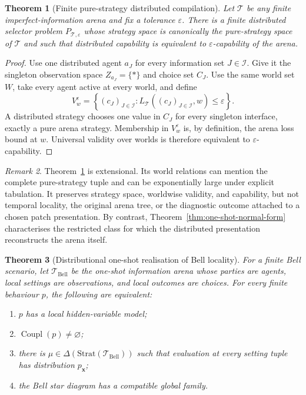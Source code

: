 \documentclass[11pt]{article}
\theoremstyle{plain}
\newtheorem{theorem}{Theorem}[section]
\theoremstyle{definition}
\theoremstyle{remark}
\newtheorem{remark}[theorem]{Remark}
\newcommand{\eps}{\varepsilon}
\begin{document}
\begin{theorem}[Finite pure-strategy distributed compilation]
\label{thm:finite-ii-compilation}
Let $\mathcal T$ be any finite imperfect-information arena and fix a tolerance
$\eps$. There is a finite distributed selector problem $P_{\mathcal T,\eps}$
whose strategy space is canonically the pure-strategy space of $\mathcal T$ and
such that distributed capability is equivalent to $\eps$-capability of the
arena.
\end{theorem}

\begin{proof}
Use one distributed agent $a_J$ for every information set $J\in\mathcal I$.
Give it the singleton observation space $Z_{a_J}=\{\ast\}$ and choice set $C_J$.
Use the same world set $W$, take every agent active at every world, and define
\[
V_w^\eps=
\left\{(c_J)_{J\in\mathcal I}:
L_{\mathcal T}((c_J)_{J\in\mathcal I},w)\le\eps\right\}.
\]
A distributed strategy chooses one value in $C_J$ for every singleton
interface, exactly a pure arena strategy. Membership in $V_w^\eps$ is, by
definition, the arena loss bound at $w$. Universal validity over worlds is
therefore equivalent to $\eps$-capability.
\end{proof}

\begin{remark}
Theorem~\ref{thm:finite-ii-compilation} is extensional. Its world relations can
mention the complete pure-strategy tuple and can be exponentially large under
explicit tabulation. It preserves strategy space, worldwise validity, and
capability, but not temporal locality, the original arena tree, or the diagnostic
outcome attached to a chosen patch presentation. By contrast,
Theorem~\ref{thm:one-shot-normal-form} characterises the restricted class for
which the distributed presentation reconstructs the arena itself.
\end{remark}

\begin{theorem}[Distributional one-shot realisation of Bell locality]
\label{thm:bell-oneshot}
For a finite Bell scenario, let $\mathcal T_{\mathrm{Bell}}$ be the one-shot
information arena whose parties are agents, local settings are observations, and
local outcomes are choices. For every finite behaviour $p$, the following are
equivalent:
\begin{enumerate}[label=(\roman*)]
\item $p$ has a local hidden-variable model;
\item $\operatorname{Coupl}(p)\ne\varnothing$;
\item there is $\mu\in\Delta(\mathrm{Strat}(\mathcal T_{\mathrm{Bell}}))$
such that evaluation at every setting tuple has distribution $p_{\mathbf x}$;
\item the Bell star diagram has a compatible global family.
\end{enumerate}
\end{theorem}
\end{document}
